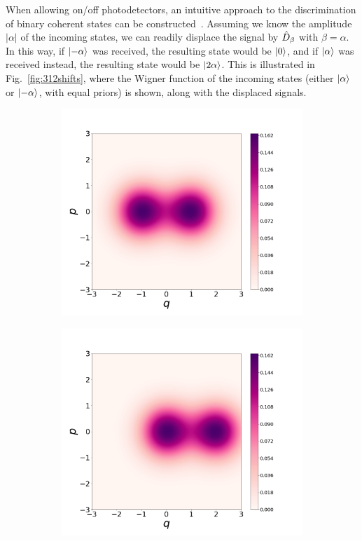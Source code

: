 When allowing on/off photodetectors, an intuitive approach to the discrimination of binary coherent states can be constructed~\cite{Kennedy1973a}. Assuming we know the amplitude $|\alpha|$ of the incoming states, we can readily displace the signal by $\hat{D}_{\beta}$ with $\beta = \alpha$. In this way, if $\ket{-\alpha}$ was received, the resulting state would be $\ket{0}$, and if $\ket{\alpha}$ was received instead, the resulting state would be $\ket{2\alpha}$. This is illustrated in Fig.~\ref{fig:312shifts}, where the Wigner function of the incoming states (either $\ket{\alpha}$ or $\ket{-\alpha}$, with equal priors)
is shown, along with the displaced signals.
 \begin{figure}[t!]
 \centering
     \begin{subfigure}[b]{0.49\textwidth}
         \centering
         \includegraphics[width=1.\textwidth]{Figures/some_wigners/bpshcoh.png}
         \caption{}
         \label{fig:312shiftsA}
     \end{subfigure}
     \hfill
     \begin{subfigure}[b]{0.49\textwidth}
         \centering
         \includegraphics[width=1.\textwidth]{Figures/some_wigners/bpshcohdisp.png}

\end{subfigure}
\end{figure}
